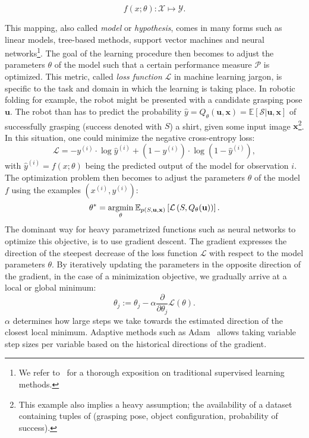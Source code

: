 \documentclass[\home/main.tex]{subfiles}
\begin{document}
\begin{equation*}
	f(x;\theta): \mathcal{X} \mapsto \mathcal{Y}.
\end{equation*}

This mapping, also called \textit{model} or \textit{hypothesis}, comes in many forms such as linear models, tree-based methods, support vector machines and neural networks\footnote{We refer to~\textcite{Murphy2012, Bishop2006, Hastie2001} for a thorough exposition on traditional supervised learning methods.}.
The goal of the learning procedure then becomes to adjust the parameters $\theta$ of the model such that a certain performance measure $\mathcal{P}$ is optimized. This metric, called \textit{loss function} $\mathcal{L}$ in machine learning jargon, is specific to the task and domain in which the learning is taking place. In robotic folding for example, the robot might be presented with a candidate grasping pose $\mathbf{u}$. The robot than has to predict the probability $\hat{y} = Q_{\theta}(\mathbf{u}, \mathbf{x}) = \mathbb{E}\left[ \mathcal{S} | \mathbf{u}, \mathbf{x} \right]$ of successfully grasping (success denoted with $S$) a shirt, given some input image $\mathbf{x}$\footnote{This example also implies a heavy assumption; the availability of a dataset containing tuples of (grasping pose, object configuration, probability of success).}.
In this situation, one could minimize the negative cross-entropy loss:
\begin{equation*}
	\mathcal{L}=-y^{(i)} \cdot \log \hat{y}^{(i)} +\left(1-y^{(i)}\right) \cdot \log \left(1-\hat{y}^{(i)}\right),
\end{equation*} with $\hat{y}^{(i)} = f(x;\theta)$ being the predicted output of the model for observation $i$.
The optimization problem then becomes to adjust the parameters $\theta$ of the model $f$ using the examples $\left(x^{(i)}, y^{(i)}\right)$:
\begin{equation*}
	\theta^{*}=\underset{\theta}{\operatorname*{argmin}} \: \mathbb{E}_{p(S, \mathbf{u}, \mathbf{x})}\left[\mathcal{L}\left(S, Q_{\theta}(\mathbf{u})\right)\right].
\end{equation*} 
The dominant way for heavy parametrized functions such as neural networks to optimize this objective, is to use gradient descent. The gradient expresses the direction of the steepest decrease of the loss function $\mathcal{L}$ with respect to the model parameters $\theta$. By iteratively updating the parameters in the opposite direction of the gradient, in the case of a minimization objective, we gradually arrive at a local or global minimum:
\begin{equation*}
	\theta_{j}:=\theta_{j}-\alpha \frac{\partial}{\partial \theta_{j}} \mathcal{L}(\theta).
\end{equation*}
$\alpha$ determines how large steps we take towards the estimated direction of the closest local minimum. Adaptive methods such as Adam~\autocite{Kingma2014} allows taking variable step sizes per variable based on the historical directions of the gradient. 
\end{document}
